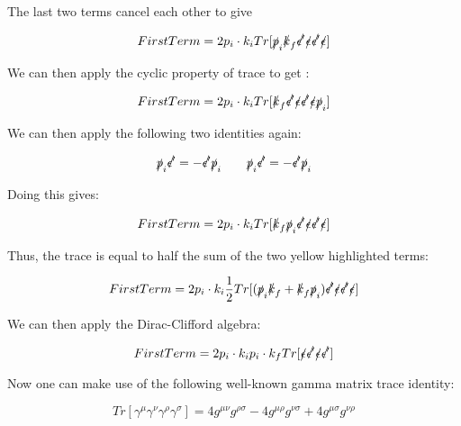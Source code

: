 \documentclass[a4]{article}
\begin{document}
    The last two terms cancel each other to give

    \begin{equation}
        First Term = 2 p_i \cdot k_i Tr [ \slashed{p}_i \slashed{k}_f \slashed{\epsilon'} \slashed{\epsilon} \slashed{\epsilon'} \slashed{\epsilon} ]
    \end{equation}

    We can then apply the cyclic property of trace to get :

    \begin{equation}
        First Term = 2 p_i \cdot k_i Tr [ \slashed{k}_f \slashed{\epsilon'} \slashed{\epsilon} \slashed{\epsilon'} \slashed{\epsilon} \slashed{p}_i ]
    \end{equation}

    We can then apply the following two identities again:

    \begin{equation}
        \slashed{p}_i \slashed{\epsilon'} = - \slashed{\epsilon'} \slashed{p}_i \qquad \slashed{p}_i \slashed{\epsilon'} = - \slashed{\epsilon'} \slashed{p}_i
    \end{equation}

    Doing this gives:

    \begin{equation}
        First Term = 2 p_i \cdot k_i Tr [ \slashed{k}_f \slashed{p}_i \slashed{\epsilon'} \slashed{\epsilon} \slashed{\epsilon'} \slashed{\epsilon} ]
    \end{equation}

    Thus, the trace is equal to half the sum of the two yellow highlighted terms:

    \begin{equation}
        First Term = 2 p_i \cdot k_i \frac{1}{2} Tr[(\slashed{p}_i \slashed{k}_f + \slashed{k}_f \slashed{p}_i) \slashed{\epsilon'} \slashed{\epsilon} \slashed{\epsilon'} \slashed{\epsilon} ]
    \end{equation}

    We can then apply the Dirac-Clifford algebra:

    \begin{equation}
        First Term = 2 p_i \cdot k_i p_i \cdot k_f Tr[ \slashed{\epsilon} \slashed{\epsilon'} \slashed{\epsilon} \slashed{\epsilon'} ]
    \end{equation}

    Now one can make use of the following well-known gamma matrix trace identity:

    \begin{equation}
        Tr [\gamma^\mu \gamma^\nu \gamma^\rho \gamma^\sigma] = 4 g^{\mu \nu} g^{\rho \sigma} - 4 g^{\mu \rho} g^{\nu \sigma} + 4 g^{\mu \sigma} g^{\nu \rho}
    \end{equation}
\end{document}
